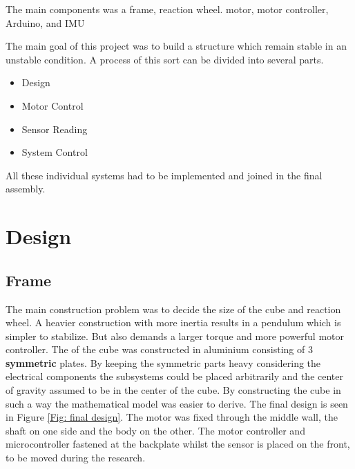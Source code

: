 \documentclass[a4paper,11pt]{kth-mag}
\begin{document}
The main components was a frame, reaction wheel. motor, motor controller, Arduino, and IMU

The main goal of this project was to build a structure which remain stable in an unstable condition. A process of this sort can be divided into several parts. 
\begin{itemize}
\item Design
\item Motor Control
\item Sensor Reading
\item System Control
\end{itemize}
All these individual systems had to be implemented and joined in the final assembly.

\section{Design}

\subsection{Frame}
The main construction problem was to decide the size of the cube and reaction wheel. A heavier construction with more inertia results in a pendulum which is simpler to stabilize. But also demands a larger torque and more powerful motor controller.
The of the cube was constructed in aluminium consisting of 3 \textbf{symmetric} plates. By keeping the symmetric parts heavy considering the electrical components the subsystems could be placed arbitrarily and the center of gravity assumed to be in the center of the cube. By constructing the cube in such a way the mathematical model was easier to derive.  The final design is seen in Figure \ref{Fig: final design}. The motor was fixed through the middle wall, the shaft on one side and the body on the other. The motor controller and microcontroller fastened at the backplate whilst the sensor is placed on the front, to be moved during the research.
\end{document}
